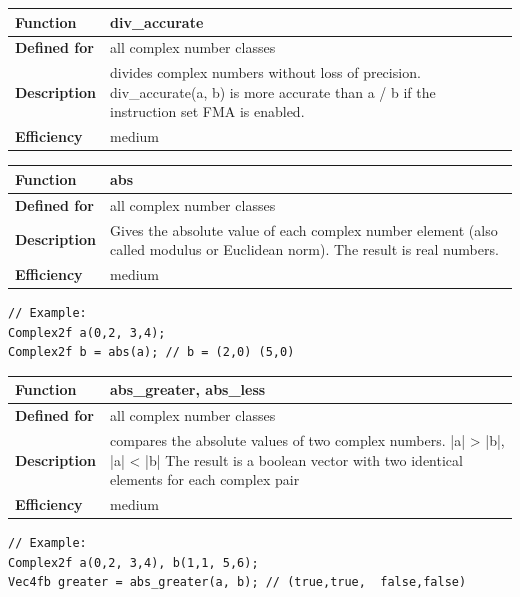 \documentclass[11pt,a4paper,oneside,openright]{report}
\newcommand{\vspacesmall}{\vspace{3mm}}
\newcommand{\vspacebig}{\vspace{6mm}}
\begin{document}
\begin{tabular}{|p{25mm}|p{100mm}|}
\hline
\bfseries Function & div\_accurate \\ \hline
\bfseries Defined for & all complex number classes  \\ \hline
\bfseries Description & divides complex numbers without loss of precision. \newline
div\_accurate(a, b) is more accurate than a / b if the instruction set FMA is enabled.\\ \hline
\bfseries Efficiency & medium \\ \hline
\end{tabular}
\vspacebig


\begin{tabular}{|p{25mm}|p{100mm}|}
\hline
\bfseries Function & abs \\ \hline
\bfseries Defined for & all complex number classes  \\ \hline
\bfseries Description & Gives the absolute value of each complex number element (also called modulus or Euclidean norm). \newline
The result is real numbers. \\ \hline
\bfseries Efficiency & medium \\ \hline
\end{tabular}
\vspacesmall

\begin{lstlisting}[frame=none]
// Example:
Complex2f a(0,2, 3,4);
Complex2f b = abs(a); // b = (2,0) (5,0)
\end{lstlisting}
\vspacebig

\begin{tabular}{|p{25mm}|p{100mm}|}
\hline
\bfseries Function & abs\_greater, abs\_less \\ \hline
\bfseries Defined for & all complex number classes  \\ \hline
\bfseries Description & compares the absolute values of two complex numbers.\newline
|a| > |b|, |a| < |b|
\newline
The result is a boolean vector with two identical elements for each complex pair \\ \hline
\bfseries Efficiency & medium \\ \hline
\end{tabular}
\vspacesmall

\begin{lstlisting}[frame=none]
// Example:
Complex2f a(0,2, 3,4), b(1,1, 5,6);
Vec4fb greater = abs_greater(a, b); // (true,true,  false,false)
\end{lstlisting}
\vspacebig
\end{document}
